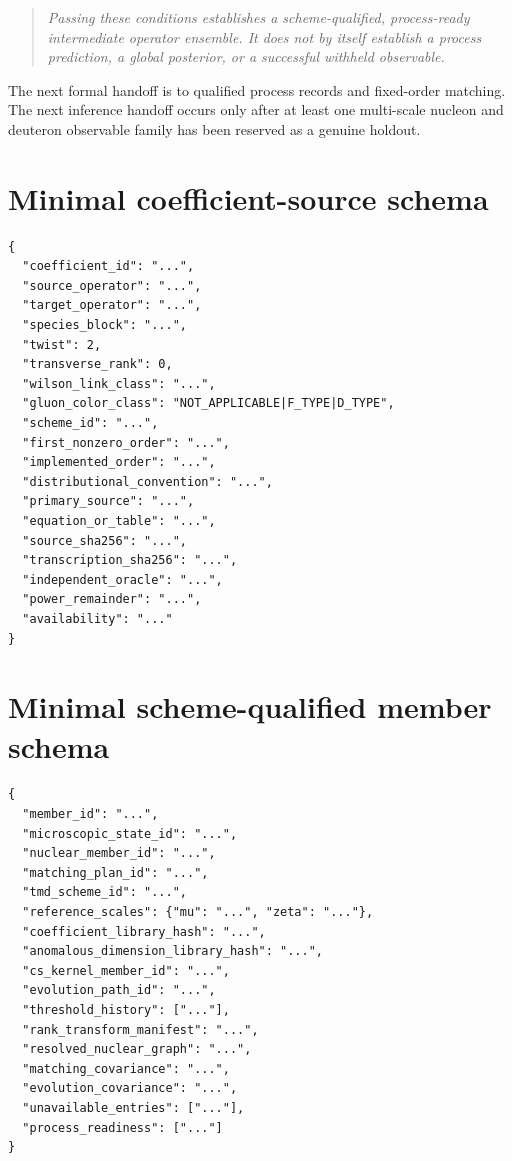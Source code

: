 \documentclass[11pt]{article}
\begin{document}
\begin{quote}
\emph{Passing these conditions establishes a scheme-qualified, process-ready intermediate operator ensemble.  It does not by itself establish a process prediction, a global posterior, or a successful withheld observable.}
\end{quote}

The next formal handoff is to qualified process records and fixed-order matching.  The next inference handoff occurs only after at least one multi-scale nucleon and deuteron observable family has been reserved as a genuine holdout.

\appendix

\section{Minimal coefficient-source schema}
\label{app:coefficient-schema}

\begin{verbatim}
{
  "coefficient_id": "...",
  "source_operator": "...",
  "target_operator": "...",
  "species_block": "...",
  "twist": 2,
  "transverse_rank": 0,
  "wilson_link_class": "...",
  "gluon_color_class": "NOT_APPLICABLE|F_TYPE|D_TYPE",
  "scheme_id": "...",
  "first_nonzero_order": "...",
  "implemented_order": "...",
  "distributional_convention": "...",
  "primary_source": "...",
  "equation_or_table": "...",
  "source_sha256": "...",
  "transcription_sha256": "...",
  "independent_oracle": "...",
  "power_remainder": "...",
  "availability": "..."
}
\end{verbatim}

\section{Minimal scheme-qualified member schema}
\label{app:member-schema}

\begin{verbatim}
{
  "member_id": "...",
  "microscopic_state_id": "...",
  "nuclear_member_id": "...",
  "matching_plan_id": "...",
  "tmd_scheme_id": "...",
  "reference_scales": {"mu": "...", "zeta": "..."},
  "coefficient_library_hash": "...",
  "anomalous_dimension_library_hash": "...",
  "cs_kernel_member_id": "...",
  "evolution_path_id": "...",
  "threshold_history": ["..."],
  "rank_transform_manifest": "...",
  "resolved_nuclear_graph": "...",
  "matching_covariance": "...",
  "evolution_covariance": "...",
  "unavailable_entries": ["..."],
  "process_readiness": ["..."]
}
\end{verbatim}
\end{document}
